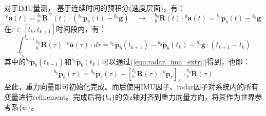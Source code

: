 \documentclass[12pt, onecolumn]{article}
\newcommand\liehat[1]{\left[ #1 \right]_\times}
\begin{document}
		对于IMU量测， 基于连续时间的预积分(速度层面)，有：
		\begin{equation}
		{^{b}\boldsymbol{a}(t)}={^{b_0}_{b}\boldsymbol{R}^\top(t)}\cdot\left( {^{b_0}\ddot{\boldsymbol{p}}_b(t)}-{^{b_0}\boldsymbol{g}}\right)
		\quad\to\quad
		{^{b_0}_{b}\boldsymbol{R}(t)}\cdot{^{b}\boldsymbol{a}(t)}= {^{b_0}\ddot{\boldsymbol{p}}_b(t)}-{^{b_0}\boldsymbol{g}}
		\end{equation}
		在$\tau\in[t_k,t_{k+1}]$时间段内，有：
		\begin{equation}
		\int_{t_k}^{t_{k+1}}{^{b_0}_{b}\boldsymbol{R}(\tau)}\cdot{^{b}\boldsymbol{a}(\tau)}\cdot d\tau=
		{^{b_0}\dot{\boldsymbol{p}}_b(t_{k+1})}-{^{b_0}\dot{\boldsymbol{p}}_b(t_k)}
		-{^{b_0}\boldsymbol{g}}\cdot (t_{k+1}-t_k)
		\end{equation}
		其中的${^{b_0}\dot{\boldsymbol{p}}_b(t_{k+1})}$和${^{b_0}\dot{\boldsymbol{p}}_b(t_k)}$可以通过(\ref{equ:radar_imu_extri})得到，也即：
		\begin{equation}
		{^{b_0}\dot{\boldsymbol{p}}_b(\tau)}=
		{^{b_0}\dot{\boldsymbol{p}}_r(\tau)}
		+\liehat{{^{b_0}_{b}\boldsymbol{R}(\tau)}\cdot{^{b}{\boldsymbol{p}}_r}}\cdot{^{b_0}_{b}\dot{\boldsymbol{R}}(\tau)}
		\end{equation}
		至此，重力向量即可初始化完成。而后使用IMU因子、radar因子对系统内的所有变量进行refinement。完成后将$\{b_0\}$的负z轴对齐到重力向量方向，将其作为世界参考系$\{w\}$。
		
\end{document}
